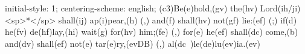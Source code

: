 initial-style: 1;
centering-scheme: english;
(c3)Be(e)hold,(gv) the(hv) Lord(ih/ji) <sp>*</sp> shall(ij) ap(i)pear,(h) (,) and(f) shall(hv) not(gf) lie:(ef) (;) if(d) he(fv) de(hf)lay,(hi) wait(g) for(hv) him;(fe) (,) for(e) he(ef) shall(dc) come,(b) and(dv) shall(ef) not(e) tar(e)ry,(evDB) (,) al(dc~)le(de)lu(ev)ia.(ev)
